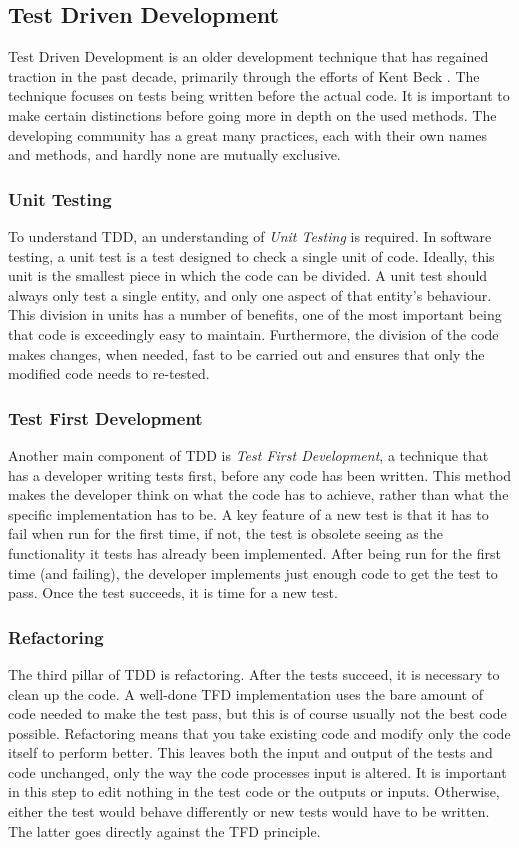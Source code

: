 \documentclass[11pt,british]{article}
\begin{document}
\subsection{Test Driven Development}
Test Driven Development is an older development technique that has regained traction 
in the past decade, primarily through the efforts of Kent Beck \cite{key-10}. The technique focuses on tests being written before the actual code. It is important to make certain distinctions before going more in depth on the used methods. The developing community has a great many practices, each with their own names and methods, and hardly none are mutually exclusive.

\subsubsection{Unit Testing}
To understand TDD, an understanding of \emph{Unit Testing} is required. In software testing, a unit test is a test designed to check a single unit of code. Ideally, this unit is the smallest piece in which the code can be divided. A unit test should always only test a single entity, and only one aspect of that entity's behaviour. This division in units has a number of benefits, one of the most important being that code is exceedingly easy to maintain. Furthermore, the division of the code makes changes, when needed, fast to be carried out and ensures that only the modified code needs to re-tested.

\subsubsection{Test First Development}
Another main component of TDD is \emph{Test First Development}, a technique that has a developer writing tests first, before any code has been written. This method makes the developer think on what the code has to achieve, rather than what the specific implementation has to be. A key feature of a new test is that it has to fail when run for the first time, if not, the test is obsolete seeing as the functionality it tests has already been implemented. After being run for the first time (and failing), the developer implements just enough code to get the test to pass. Once the test succeeds, it is time for a new test.

\subsubsection{Refactoring}
The third pillar of TDD is refactoring. After the tests succeed, it is necessary to clean up the code. A well-done TFD implementation uses the bare amount of code needed to make the test pass, but this is of course usually not the best code possible. Refactoring means that you take existing code and modify only the code itself to perform better. This leaves both the input and output of the tests and code unchanged, only the way the code processes input is altered. It is important in this step to edit nothing in the test code or the outputs or inputs. Otherwise, either the test would behave differently or new tests would have to be written. The latter goes directly against the TFD principle.
\end{document}
